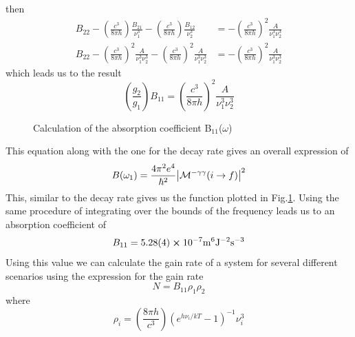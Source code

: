 then
\begin{equation}
\begin{split}
    B_{22}-\left(\frac{c^3}{8\pi h}\right) \frac{B_{21}}{\nu_1^3} - \left(\frac{c^3}{8\pi h}\right) \frac{B_{12}}{\nu_2^3}&=-\left(\frac{c^3}{8\pi h}\right)^2\frac{A}{\nu_1^3 \nu_2^3}\\
    B_{22}-\left(\frac{c^3}{8\pi h}\right)^2\frac{A}{\nu_1^3 \nu_2^3}-\left(\frac{c^3}{8\pi h}\right)^2\frac{A}{\nu_1^3 \nu_2^3}&=-\left(\frac{c^3}{8\pi h}\right)^2\frac{A}{\nu_1^3 \nu_2^3}
\end{split}
\end{equation}
which leads us to the result
\begin{equation}
    \left(\frac{g_2}{g_1}\right)B_{11}=\left(\frac{c^3}{8\pi h}\right)^2
    \frac{A}{\nu_1^3\nu_2^3}
\end{equation}
\begin{figure}
    \centering
    \caption{Calculation of the absorption coefficient B$_{11}$($\omega$)}
    \label{fig:Calculation of the Absorption Rate}
\end{figure}
This equation along with the one for the decay rate gives an overall expression of
\begin{equation}
     B(\omega_1)=\frac{4\pi^2e^4}{\hbar^2}\abs{\mathcal{M}^{-\gamma\gamma}(i\rightarrow f)}^2
\end{equation}
This, similar to the decay rate gives us the function plotted in Fig.\ref{fig:Calculation of the Absorption Rate}. Using the same procedure of integrating over the bounds of the frequency leads us to an absorption coefficient of
\begin{equation}
    B_{11} = 5.28(4)\cross10^{-7} \rm{m^6 J^{-2} s^{-3}}
\end{equation}
Using this value we can calculate the gain rate of a system for several different scenarios using the expression for the gain rate
\begin{equation}
    N=B_{11}\rho_1\rho_2    
\end{equation}
where
\begin{equation}
    \rho_i=\left(\frac{8\pi h}{c^3}\right)(e^{h\nu_i/kT}-1)^{-1} \nu_i^3
\end{equation}
